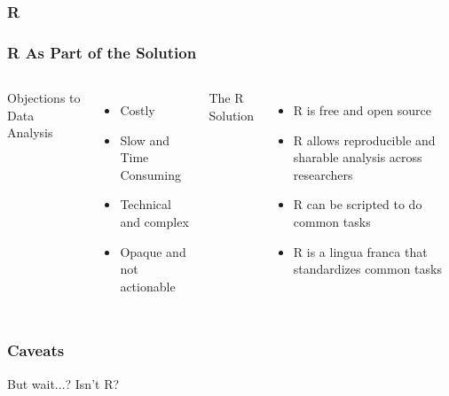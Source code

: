 \documentclass{beamer}
\begin{document}
{
\begin{frame}[plain]
\frametitle{R}
\end{frame}
}


\begin{frame}
\frametitle{R As Part of the Solution}
  \begin{columns}
  Objections to Data Analysis
  \begin{itemize}
  \item Costly
  \item Slow and Time Consuming
  \item Technical and complex
  \item Opaque and not actionable
  \end{itemize}
  The R Solution
  \begin{itemize}
  \item R is free and open source
  \item R allows reproducible and sharable analysis across researchers
  \item R can be scripted to do common tasks
  \item R is a lingua franca that standardizes common tasks
  \end{itemize}
  \end{columns}
\end{frame}


\begin{frame}
\frametitle{Caveats}
\begin{center}
\Large But wait...? Isn't R?
\end{center}
\end{frame}
\end{document}
